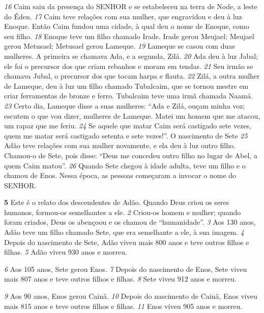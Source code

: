 \textit{\tiny 16}
Caim saiu da presença do SENHOR e se estabeleceu na terra de Node, a leste do
Éden.
\textit{\tiny 17}
Caim teve relações com sua mulher, que engravidou e deu à luz Enoque. Então
Caim fundou uma cidade, à qual deu o nome de Enoque, como seu filho.
\textit{\tiny 18}
Enoque teve um filho chamado Irade. Irade gerou Meujael; Meujael gerou
Metusael; Metusael gerou Lameque.
\textit{\tiny 19}
Lameque se casou com duas mulheres. A primeira se chamava Ada, e a
segunda, Zilá.  
\textit{\tiny 20}
Ada deu à luz Jabal; ele foi o precursor dos que criam rebanhos e
moram em tendas.  
\textit{\tiny 21}
Seu irmão se chamava Jubal, o precursor dos que tocam
harpa e flauta.  
\textit{\tiny 22}
Zilá, a outra mulher de Lameque, deu à luz um filho chamado
Tubalcaim, que se tornou mestre em criar ferramentas de bronze e ferro.
Tubalcaim teve uma irmã chamada Naamá.  
\textit{\tiny 23}
Certo dia, Lameque disse a suas
mulheres:
  “Ada e Zilá, ouçam minha voz;
    escutem o que vou dizer, mulheres de Lameque.
  Matei um homem que me atacou,
    um rapaz que me feriu.
\textit{\tiny 24}
Se aquele que matar Caim será castigado sete vezes,
    quem me matar será castigado setenta e sete vezes!”.
O nascimento de Sete
\textit{\tiny 25}
Adão teve relações com sua mulher novamente, e ela deu à luz outro filho.
Chamou-o de Sete, pois disse: “Deus me concedeu outro filho no lugar de Abel, a
quem Caim matou”.  
\textit{\tiny 26}
Quando Sete chegou à idade adulta, teve um filho e o
chamou de Enos. Nessa época, as pessoas começaram a invocar o nome do
SENHOR.

\bigskip
\textbf{\large 5} 
Este é o relato dos descendentes de Adão. Quando Deus criou os seres
humanos, formou-os semelhantes a ele. 
\textit{\tiny 2}
Criou-os homem e mulher; quando
foram criados, Deus os abençoou e os chamou de “humanidade”.
\textit{\tiny 3}
Aos   130 anos, Adão teve um filho chamado Sete, que era semelhante a ele, à sua
 imagem. 
\textit{\tiny 4}
Depois do nascimento de Sete, Adão viveu mais 800 anos e teve outros
 filhos e filhas. 
\textit{\tiny 5}
Adão viveu 930 anos e morreu.

\bigskip
\textit{\tiny 6}
Aos 105 anos, Sete gerou Enos. 
\textit{\tiny 7}
Depois do nascimento de Enos, Sete viveu mais 807 anos e teve outros filhos e filhas. 
\textit{\tiny 8}
Sete viveu 912 anos e morreu.

\bigskip
\textit{\tiny 9}
Aos 90 anos, Enos gerou Cainã. 
\textit{\tiny 10}
Depois do nascimento de Cainã, Enos viveu mais 815 anos e teve outros filhos e filhas.  
\textit{\tiny 11}
Enos viveu 905 anos e morreu.

